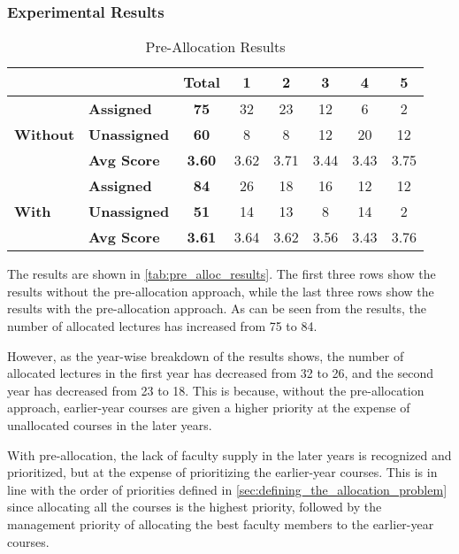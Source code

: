 \subsubsection{Experimental Results}

\begin{table}[H]
  \centering
  \begin{tabular}{|l|l|c|c|c|c|c|c|}
    \hline
                     &                     & \textbf{Total} & \textbf{1} & \textbf{2} & \textbf{3} & \textbf{4} & \textbf{5} \\ \hline
                     & \textbf{Assigned}   & \textbf{75}    & 32         & 23         & 12         & 6          & 2          \\
    \textbf{Without} & \textbf{Unassigned} & \textbf{60}    & 8          & 8          & 12         & 20         & 12         \\
                     & \textbf{Avg Score}  & \textbf{3.60}  & 3.62       & 3.71       & 3.44       & 3.43       & 3.75       \\\hline
                     & \textbf{Assigned}   & \textbf{84}    & 26         & 18         & 16         & 12         & 12         \\
    \textbf{With}    & \textbf{Unassigned} & \textbf{51}    & 14         & 13         & 8          & 14         & 2          \\
                     & \textbf{Avg Score}  & \textbf{3.61}  & 3.64       & 3.62       & 3.56       & 3.43       & 3.76       \\
    \hline
  \end{tabular}
  \caption{Pre-Allocation Results}
  \label{tab:pre_alloc_results}
\end{table}

The results are shown in \autoref{tab:pre_alloc_results}. The first three rows show the results without the pre-allocation approach, while the last three rows show the results with the pre-allocation approach. As can be seen from the results, the number of allocated lectures has increased from 75 to 84.

However, as the year-wise breakdown of the results shows, the number of allocated lectures in the first year has decreased from 32 to 26, and the second year has decreased from 23 to 18. This is because, without the pre-allocation approach, earlier-year courses are given a higher priority at the expense of unallocated courses in the later years.

With pre-allocation, the lack of faculty supply in the later years is recognized and prioritized, but at the expense of prioritizing the earlier-year courses. This is in line with the order of priorities defined in \autoref{sec:defining_the_allocation_problem} since allocating all the courses is the highest priority, followed by the management priority of allocating the best faculty members to the earlier-year courses.



